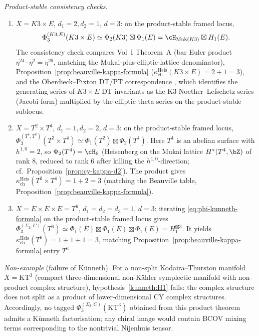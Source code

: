 \begin{proposition}
\textit{Product-stable consistency checks.}
\begin{enumerate}[label=\textup{(\alph*)}]
\item $X = K3 \times E$, $d_1 = 2, d_2 = 1$, $d = 3$: on the product-stable framed locus,
\[
\Phi_3^{(K3,E)}(K3 \times E) \simeq \Phi_2(K3) \boxtimes \Phi_1(E)
= \cH_{\mathrm{Muk}(K3)} \boxtimes H_1(E).
\]
The consistency check compares Vol~I Theorem~A \textup{(}bar Euler product $\eta^{24} \cdot \eta^2 = \eta^{26}$, matching the Mukai-plus-elliptic-lattice denominator\textup{),} Proposition~\textup{\ref{prop:beauville-kappa-formula}} \textup{(}$\kappa_{\mathrm{ch}}^{\mathrm{Heis}}(K3 \times E) = 2 + 1 = 3$\textup{),} and the Oberdieck--Pixton DT/PT correspondence \cite{OberdieckPixton2019InventMath}, which identifies the generating series of $K3 \times E$ DT invariants as the K3 Noether--Lefschetz series \textup{(}Jacobi form\textup{)} multiplied by the elliptic theta series on the product-stable sublocus.
\item $X = T^2 \times T^4$, $d_1 = 1, d_2 = 2$, $d = 3$: on the product-stable framed locus, $\Phi_3^{(T^4,T^2)}(T^2 \times T^4) \simeq \Phi_1(T^2) \boxtimes \Phi_2(T^4)$. Here $T^4$ is an abelian surface with $h^{1,0} = 2$, so $\Phi_2(T^4) = \cH_6$ \textup{(}Heisenberg on the Mukai lattice $H^*(T^4, \bZ)$ of rank $8$, reduced to rank $6$ after killing the $h^{1,0}$-direction; cf.\ Proposition~\textup{\ref{prop:cy-kappa-d2}}\textup{).} The product gives $\kappa_{\mathrm{ch}}^{\mathrm{Heis}}(T^2 \times T^4) = 1 + 2 = 3$ \textup{(}matching the Beauville table, Proposition~\textup{\ref{prop:beauville-kappa-formula}}\textup{).}
\item $X = E \times E \times E = T^6$, $d_1 = d_2 = d_3 = 1$, $d = 3$: iterating \eqref{eq:phi-kunneth-formula} on the product-stable framed locus gives $\Phi_3^{(\Sigma_2,C)}(T^6) \simeq \Phi_1(E) \boxtimes \Phi_1(E) \boxtimes \Phi_1(E) = H_1^{\boxtimes 3}$. It yields $\kappa_{\mathrm{ch}}^{\mathrm{Heis}}(T^6) = 1 + 1 + 1 = 3$, matching Proposition~\textup{\ref{prop:beauville-kappa-formula}} entry $T^6$.
\end{enumerate}

\textit{Non-example} \textup{(}failure of K\"unneth\textup{).} For a non-split Kodaira--Thurston manifold $X = \mathrm{KT}^3$ \textup{(}compact three-dimensional non-K\"ahler symplectic manifold with non-product complex structure\textup{),} hypothesis~\textup{\ref{kunneth:H1}} fails: the complex structure does not split as a product of lower-dimensional CY complex structures. Accordingly, no tagged $\Phi_3^{(\Sigma_2,C)}(\mathrm{KT}^3)$ obtained from this product theorem admits a K\"unneth factorisation; any chiral image would contain BCOV mixing terms corresponding to the nontrivial Nijenhuis tensor.
\end{proposition}

